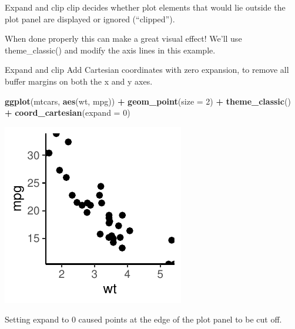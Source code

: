 \documentclass[
  ignorenonframetext,
]{beamer}
\newenvironment{Shaded}{\begin{snugshade}}{\end{snugshade}}
\newcommand{\AttributeTok}[1]{\textcolor[rgb]{0.13,0.29,0.53}{#1}}
\newcommand{\DecValTok}[1]{\textcolor[rgb]{0.00,0.00,0.81}{#1}}
\newcommand{\FunctionTok}[1]{\textcolor[rgb]{0.13,0.29,0.53}{\textbf{#1}}}
\newcommand{\NormalTok}[1]{#1}
\newcommand{\SpecialCharTok}[1]{\textcolor[rgb]{0.81,0.36,0.00}{\textbf{#1}}}
\begin{document}
\begin{frame}{Expand and clip}
\label{expand-and-clip-2}
clip decides whether plot elements that would lie outside the plot panel
are displayed or ignored (``clipped'').

When done properly this can make a great visual effect! We'll use
theme\_classic() and modify the axis lines in this example.
\end{frame}

\begin{frame}[fragile]{Expand and clip}
\label{expand-and-clip-3}
Add Cartesian coordinates with zero expansion, to remove all buffer
margins on both the x and y axes.


\begin{Shaded}
\begin{Highlighting}[]
\FunctionTok{ggplot}\NormalTok{(mtcars, }\FunctionTok{aes}\NormalTok{(wt, mpg)) }\SpecialCharTok{+} \FunctionTok{geom\_point}\NormalTok{(}\AttributeTok{size =} \DecValTok{2}\NormalTok{) }\SpecialCharTok{+} \FunctionTok{theme\_classic}\NormalTok{() }\SpecialCharTok{+}
    \FunctionTok{coord\_cartesian}\NormalTok{(}\AttributeTok{expand =} \DecValTok{0}\NormalTok{)}
\end{Highlighting}
\end{Shaded}

\begin{center}\includegraphics[width=0.5\linewidth]{Figs/unnamed-chunk-46-1} \end{center}

Setting expand to 0 caused points at the edge of the plot panel to be
cut off.
\end{frame}
\end{document}
